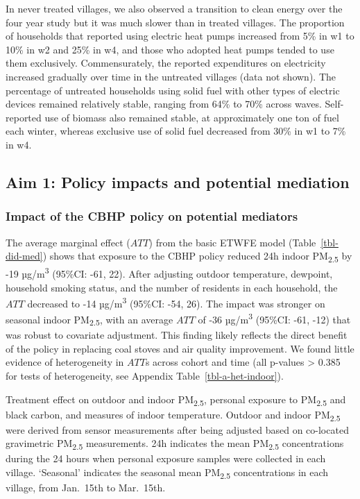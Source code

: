 \documentclass[
  letterpaper,
  DIV=11,
  numbers=noendperiod]{scrartcl}
\makeatletter
\renewenvironment{table}%
   {\renewcommand\familydefault\sfdefault
    \@float{table}}
   {\end@float}
\makeatother
\begin{document}
In never treated villages, we also observed a transition to clean energy
over the four year study but it was much slower than in treated
villages. The proportion of households that reported using electric heat
pumps increased from 5\% in w1 to 10\% in w2 and 25\% in w4, and those
who adopted heat pumps tended to use them exclusively. Commensurately,
the reported expenditures on electricity increased gradually over time
in the untreated villages (data not shown). The percentage of untreated
households using solid fuel with other types of electric devices
remained relatively stable, ranging from 64\% to 70\% across waves.
Self-reported use of biomass also remained stable, at approximately one
ton of fuel each winter, whereas exclusive use of solid fuel decreased
from 30\% in w1 to 7\% in w4.

\subsection{Aim 1: Policy impacts and potential
mediation}\label{aim-1-policy-impacts-and-potential-mediation}

\subsubsection{Impact of the CBHP policy on potential
mediators}\label{impact-of-the-cbhp-policy-on-potential-mediators}

The average marginal effect (\(ATT\)) from the basic ETWFE model
(Table~\ref{tbl-did-med}) shows that exposure to the CBHP policy reduced
24h indoor PM\textsubscript{2.5} by -19 µg/m\textsuperscript{3} (95\%CI:
-61, 22). After adjusting outdoor temperature, dewpoint, household
smoking status, and the number of residents in each household, the
\(ATT\) decreased to -14 µg/m\textsuperscript{3} (95\%CI: -54, 26). The
impact was stronger on seasonal indoor PM\textsubscript{2.5}, with an
average \(ATT\) of -36 µg/m\textsuperscript{3} (95\%CI: -61, -12) that
was robust to covariate adjustment. This finding likely reflects the
direct benefit of the policy in replacing coal stoves and air quality
improvement. We found little evidence of heterogeneity in \(ATT\)s
across cohort and time (all p-values \textgreater{} 0.385 for tests of
heterogeneity, see Appendix Table~\ref{tbl-a-het-indoor}).

\begin{table}

\caption{\label{tbl-did-med}Treatment effect on outdoor and indoor
PM\textsubscript{2.5}, personal exposure to PM\textsubscript{2.5} and
black carbon, and measures of indoor temperature. Outdoor and indoor
PM\textsubscript{2.5} were derived from sensor measurements after being
adjusted based on co-located gravimetric PM\textsubscript{2.5}
measurements. 24h indicates the mean PM\textsubscript{2.5}
concentrations during the 24 hours when personal exposure samples were
collected in each village. `Seasonal' indicates the seasonal mean
PM\textsubscript{2.5} concentrations in each village, from Jan.~15th to
Mar.~15th.}

\centering{

}

\end{table}%
\end{document}
